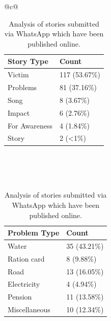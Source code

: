 \begin{table}[h]
\caption{Analysis of stories submitted via WhatsApp which have been published online.}
\centering

\begin{tabular}{@{}c@{}}
\\ \hline
    
    \begin{tabular}{l l}\hline
        
        Story Type & Count   \\ \hline
        
        Victim &	117 (53.67\%) \\
        Problems & 81 (37.16\%)	 \\
        Song & 8 (3.67\%)	\\
        Impact	& 6 (2.76\%)\\
        For Awareness & 4 (1.84\%) \\
        Story & 2 (<1\%)	\\
        \hline
    \end{tabular} \\\\
\\ \hline
    \begin{tabular}{l l }
         \hline
         Problem Type  & Count \\
        \hline
        Water  & 35 (43.21\%)  \\
        Ration card  & 8 (9.88\%)	\\
        Road & 13 (16.05\%)  \\
        Electricity & 4 (4.94\%) \\
        Pension & 11 (13.58\%) \\
        Miscellaneous & 10 (12.34\%) \\
        \hline
    \end{tabular}
   \end{tabular}

    \label{fig:smartphone_features}
    
\end{table}